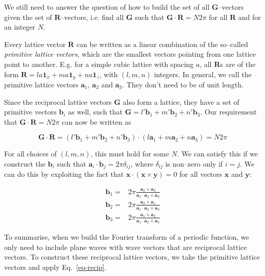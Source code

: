 We still need to answer the question of how to build the set of all ${\mathbf G}$--vectors given the set of ${\mathbf R}$--vectors, i.e. find all ${\mathbf G}$ such that ${\mathbf G} \cdot {\mathbf R} = N 2 \pi$ for all ${\mathbf R}$ and for an integer $N$.

Every lattice vector ${\mathbf R}$ can be written as a linear combination of the so--called \emph{primitive lattice vectors}, which are the smallest vectors pointing from one lattice point to another. E.g. for a simple cubic lattice with spacing $a$, all ${\mathbf R}$s are of the form ${\mathbf R} = la {\mathbf 1}_x + ma {\mathbf 1}_y + na {\mathbf 1}_z$, with $(l,m,n)$ integers. In general, we call the primitive lattice vectors ${\mathbf a}_1$, ${\mathbf a}_2$ and ${\mathbf a}_3$. They don't need to be of unit length.

Since the reciprocal lattice vectors ${\mathbf G}$ also form a lattice, they have a set of primitive vectors ${\mathbf b}_i$ as well, such that ${\mathbf G} = l' {\mathbf b}_1 + m' {\mathbf b}_2 + n' {\mathbf b}_3$. Our requirement that ${\mathbf G} \cdot {\mathbf R} = N 2 \pi$ can now be written as

\begin{equation}
{\mathbf G} \cdot {\mathbf R} = ( l' {\mathbf b}_1 + m' {\mathbf b}_2 + n' {\mathbf b}_3) \cdot (l {\mathbf a}_1 + m {\mathbf a}_2 + n {\mathbf a}_3)  = N 2 \pi 
\end{equation} 

For all choices of $(l,m,n)$, this must hold for some $N$. We can satisfy this if we construct the ${\mathbf b}_i$ such that ${\mathbf a}_i \cdot {\mathbf b}_j = 2 \pi \delta_{ij}$, where $\delta_{ij}$ is non--zero only if $i=j$. We can do this by exploiting the fact that $ {\mathbf x} \cdot ({\mathbf x} \times {\mathbf y}) = 0$ for all vectors ${\mathbf x}$ and ${\mathbf y}$:

\begin{align}
{\mathbf b}_1 =& 2 \pi \frac{{\mathbf a}_2 \times {\mathbf a}_3}{{\mathbf a}_1 \cdot {\mathbf a}_2 \times {\mathbf a}_3} \nonumber \\
{\mathbf b}_2 =& 2 \pi \frac{{\mathbf a}_3 \times {\mathbf a}_1}{{\mathbf a}_1 \cdot {\mathbf a}_2 \times {\mathbf a}_3} \nonumber \\
{\mathbf b}_3 =& 2 \pi \frac{{\mathbf a}_1 \times {\mathbf a}_2}{{\mathbf a}_1 \cdot {\mathbf a}_2 \times {\mathbf a}_3}
\label{eq-recip}
\end{align} 

To summarise, when we build the Fourier transform of a periodic function, we only need to include plane waves with wave vectors that are reciprocal lattice vectors. To construct these reciprocal lattice vectors, we take the primitive lattice vectors and apply Eq.~\ref{eq-recip}.

